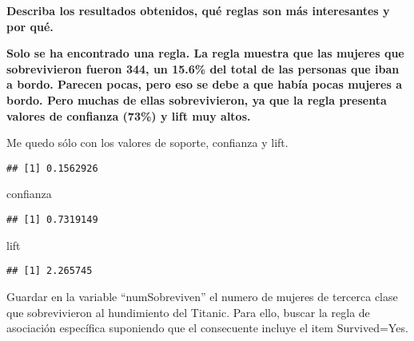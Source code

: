 \documentclass[]{article}
\newenvironment{Shaded}{\begin{snugshade}}{\end{snugshade}}
\newcommand{\KeywordTok}[1]{\textcolor[rgb]{0.13,0.29,0.53}{\textbf{#1}}}
\newcommand{\NormalTok}[1]{#1}
\newcommand{\OperatorTok}[1]{\textcolor[rgb]{0.81,0.36,0.00}{\textbf{#1}}}
\newcommand{\StringTok}[1]{\textcolor[rgb]{0.31,0.60,0.02}{#1}}
\begin{document}
\textbf{Describa los resultados obtenidos, qué reglas son más
interesantes y por qué.}

\newpage

\textbf{Solo se ha encontrado una regla. La regla muestra que las
mujeres que sobrevivieron fueron 344, un 15.6\% del total de las
personas que iban a bordo. Parecen pocas, pero eso se debe a que había
pocas mujeres a bordo. Pero muchas de ellas sobrevivieron, ya que la
regla presenta valores de confianza (73\%) y lift muy altos.}

Me quedo sólo con los valores de soporte, confianza y lift.

\begin{Shaded}
\end{Shaded}

\begin{verbatim}
## [1] 0.1562926
\end{verbatim}

\begin{Shaded}
\begin{Highlighting}[]
\NormalTok{confianza}
\end{Highlighting}
\end{Shaded}

\begin{verbatim}
## [1] 0.7319149
\end{verbatim}

\begin{Shaded}
\begin{Highlighting}[]
\NormalTok{lift}
\end{Highlighting}
\end{Shaded}

\begin{verbatim}
## [1] 2.265745
\end{verbatim}

Guardar en la variable ``numSobreviven'' el numero de mujeres de
tercerca clase que sobrevivieron al hundimiento del Titanic. Para ello,
buscar la regla de asociación específica suponiendo que el consecuente
incluye el item Survived=Yes.
\end{document}
